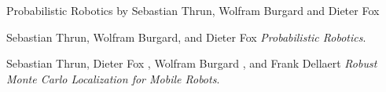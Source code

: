 \documentclass[10pt,journal,compsoc]{IEEEtran}
\begin{document}
Probabilistic Robotics by Sebastian Thrun, Wolfram Burgard and Dieter Fox

\begin{thebibliography}{9}


Sebastian Thrun, Wolfram Burgard, and Dieter Fox
\textit{Probabilistic Robotics}. 

Sebastian Thrun, Dieter Fox , Wolfram Burgard , and Frank Dellaert
\textit{Robust Monte Carlo Localization for Mobile Robots}. 
\end{thebibliography}
\end{document}
